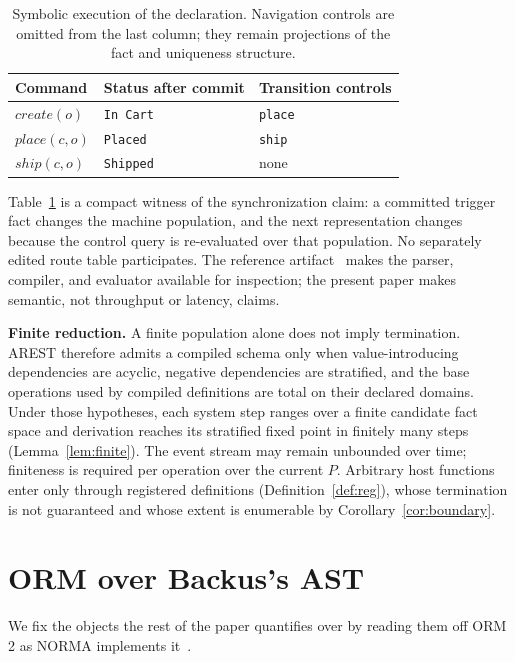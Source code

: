 \documentclass[10pt,twocolumn]{article}
\theoremstyle{plain}
\theoremstyle{definition}
\begin{document}
\begin{table}[t]
\centering
\small
\begin{tabular}{@{}p{}p{}p{}@{}}
\toprule
Command & Status after commit & Transition controls \\
\midrule
$\mathit{create}(o)$ & \texttt{In Cart} & \texttt{place} \\
$\mathit{place}(c,o)$ & \texttt{Placed} & \texttt{ship} \\
$\mathit{ship}(c,o)$ & \texttt{Shipped} & none \\
\bottomrule
\end{tabular}
\caption{Symbolic execution of the declaration. Navigation controls are omitted from the last column; they remain projections of the fact and uniqueness structure.}
\label{tab:trace}
\end{table}
Table~\ref{tab:trace} is a compact witness of the synchronization claim: a committed trigger fact changes the machine population, and the next representation changes because the control query is re-evaluated over that population. No separately edited route table participates. The reference artifact~\cite{arest} makes the parser, compiler, and evaluator available for inspection; the present paper makes semantic, not throughput or latency, claims.

\smallskip\noindent\textbf{Finite reduction.} A finite population alone does not imply termination. AREST therefore admits a compiled schema only when value-introducing dependencies are acyclic, negative dependencies are stratified, and the base operations used by compiled definitions are total on their declared domains. Under those hypotheses, each system step ranges over a finite candidate fact space and derivation reaches its stratified fixed point in finitely many steps (Lemma~\ref{lem:finite}). The event stream may remain unbounded over time; finiteness is required per operation over the current $P$. Arbitrary host functions enter only through registered definitions (Definition~\ref{def:reg}), whose termination is not guaranteed and whose extent is enumerable by Corollary~\ref{cor:boundary}.


\section{ORM over Backus's AST}\label{sec:mapping}

We fix the objects the rest of the paper quantifies over by reading them off ORM 2 as NORMA implements it~\cite{halpin08,norma}.
\end{document}
